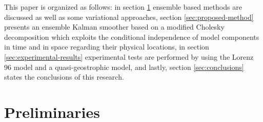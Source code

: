 This paper is organized as follows: in section \ref{sec:preliminaries} ensemble based methods are discussed as well as some variational approaches, section \ref{sec:proposed-method} presents an ensemble Kalman smoother based on a modified Cholesky decomposition which exploits the conditional independence of model components in time and in space regarding their physical locations, in section \ref{sec:experimental-results} experimental tests are performed by using the Lorenz 96 model and a quasi-geostrophic model, and lastly, section \ref{sec:conclusions} states the conclusions of this research. 



\section{Preliminaries}
\label{sec:preliminaries}

